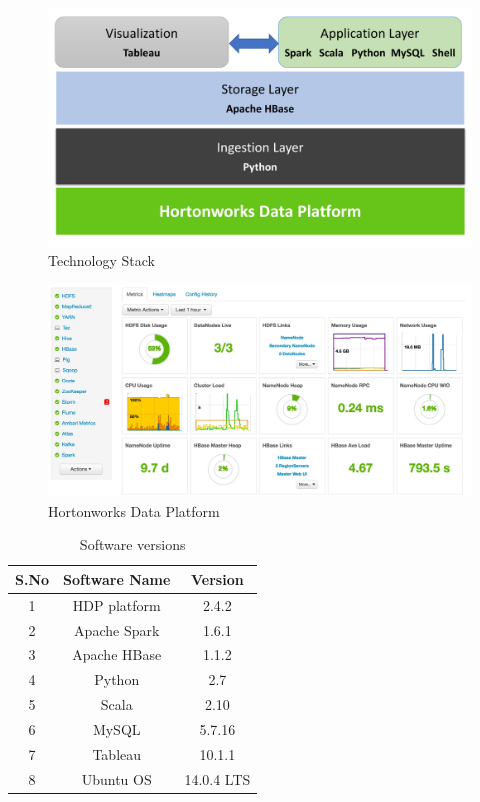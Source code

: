 \documentclass{acm_proc_article-sp}
\begin{document}
\begin{figure}[!ht]
  \centering
      \includegraphics[width=1.0\columnwidth]{images/tech_stack.pdf}
  \caption{Technology Stack}\label{F:techstack}
\end{figure}

\begin{figure}[!ht]
  \centering
      \includegraphics[width=1.0\columnwidth]{images/ambari_dashboard.jpeg}
  \caption{Hortonworks Data Platform}\label{F:dashboard}
\end{figure}

\begin{table}[htb]
\caption{Software versions}\label{T:softwareversion}
\bigskip
\begin{center}
\begin{tabular}{|c|c|c|} \hline S.No & Software Name & Version\\ \hline
1 & HDP platform & 2.4.2\\ \hline
2 & Apache Spark & 1.6.1\\ \hline
3 & Apache HBase & 1.1.2\\ \hline
4 & Python & 2.7\\ \hline
5 & Scala & 2.10\\ \hline
6 & MySQL & 5.7.16\\ \hline
7 & Tableau & 10.1.1\\ \hline
8 & Ubuntu OS & 14.0.4 LTS \\
\hline
\end{tabular}
\end{center}
\end{table}
\end{document}
